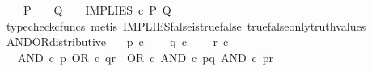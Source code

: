 \begin{isabellebody}
\ \ \ \ {\isachardoublequoteopen}{\isacharparenleft}{\kern0pt}P\ {\isacharequal}{\kern0pt}\ {\isasymt}\ {\isasymLongrightarrow}\ Q\ {\isacharequal}{\kern0pt}\ {\isasymt}{\isacharparenright}{\kern0pt}\ {\isasymLongrightarrow}\ IMPLIES\ {\isasymcirc}\isactrlsub c\ {\isasymlangle}P{\isacharcomma}{\kern0pt}\ Q{\isasymrangle}\ {\isacharequal}{\kern0pt}\ {\isasymt}{\isachardoublequoteclose}\isanewline
%
\isadelimproof
\ \ %
\endisadelimproof
%
\isatagproof
{}\isamarkupfalse%
\ {\isacharparenleft}{\kern0pt}typecheck{\isacharunderscore}{\kern0pt}cfuncs{\isacharcomma}{\kern0pt}\ metis\ IMPLIES{\isacharunderscore}{\kern0pt}false{\isacharunderscore}{\kern0pt}is{\isacharunderscore}{\kern0pt}true{\isacharunderscore}{\kern0pt}false\ true{\isacharunderscore}{\kern0pt}false{\isacharunderscore}{\kern0pt}only{\isacharunderscore}{\kern0pt}truth{\isacharunderscore}{\kern0pt}values{\isacharparenright}{\kern0pt}%
\endisatagproof
{\isafoldproof}%
%
\isadelimproof
%
\endisadelimproof
%
\isadelimdocument
%
\endisadelimdocument
%
\isatagdocument
%
\isamarkuptrue%
%
\endisatagdocument
{\isafolddocument}%
%
\isadelimdocument
%
\endisadelimdocument
{}\isamarkupfalse%
\ AND{\isacharunderscore}{\kern0pt}OR{\isacharunderscore}{\kern0pt}distributive{\isacharcolon}{\kern0pt}\isanewline
\ \ \ {\isachardoublequoteopen}p\ {\isasymin}\isactrlsub c\ {\isasymOmega}{\isachardoublequoteclose}\isanewline
\ \ \ {\isachardoublequoteopen}q\ {\isasymin}\isactrlsub c\ {\isasymOmega}{\isachardoublequoteclose}\isanewline
\ \ \ {\isachardoublequoteopen}r\ {\isasymin}\isactrlsub c\ {\isasymOmega}{\isachardoublequoteclose}\isanewline
\ \ \ {\isachardoublequoteopen}AND\ {\isasymcirc}\isactrlsub c\ {\isasymlangle}p{\isacharcomma}{\kern0pt}\ OR\ {\isasymcirc}\isactrlsub c\ {\isasymlangle}q{\isacharcomma}{\kern0pt}r{\isasymrangle}{\isasymrangle}\ {\isacharequal}{\kern0pt}\ OR\ {\isasymcirc}\isactrlsub c\ {\isasymlangle}AND\ {\isasymcirc}\isactrlsub c\ {\isasymlangle}p{\isacharcomma}{\kern0pt}q{\isasymrangle}{\isacharcomma}{\kern0pt}\ AND\ {\isasymcirc}\isactrlsub c\ {\isasymlangle}p{\isacharcomma}{\kern0pt}r{\isasymrangle}{\isasymrangle}{\isachardoublequoteclose}\isanewline
%
\isadelimproof
\ \ %
\endisadelimproof
%
\isatagproof
{}\isamarkupfalse%

\end{isabellebody}
